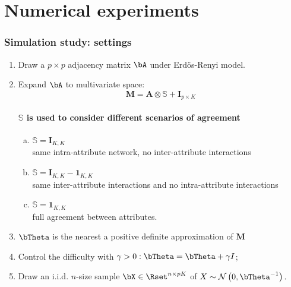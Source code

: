 \section{Numerical experiments}

\begin{frame}
  \frametitle{Simulation study: settings}

  \begin{enumerate}
\item  Draw a $p \times p$ adjacency matrix $\bA$ under Erd\"os-Renyi model.
\item  Expand $\bA$  to  multivariate space: 
  $$\mathbf{M} = \mathbf{A}  \otimes \mathbb{S} + \mathbf{I}_{p\times K}$$
  \paragraph{$\mathbb{S}$ is used to consider different scenarios of agreement}
  \begin{enumerate}[a)]
  \item $\mathbb{S} = \mathbf{I}_{K,K}$ \\ 
    \rsa same intra-attribute network, no inter-attribute interactions
  \item $\mathbb{S} = \mathbf{I}_{K,K} - \mathbf{1}_{K,K}$ \\ 
  \rsa same inter-attribute interactions and no intra-attribute interactions
  \item $\mathbb{S} = \mathbf{1}_{K,K}$ \\
    \rsa full agreement between  attributes.
  \end{enumerate}
\item $\bTheta$ is the nearest a positive definite approximation of $\mathbf{M}$
\item Control the difficulty with $\gamma>0: \bTheta= \bTheta+ \gamma I$;
\item Draw an i.i.d. $n$-size sample $\bX\in\Rset^{n\times pK}$ of
  $X \sim \mathcal{N} \left( 0,\invcov^{-1} \right) .$
\end{enumerate}


\end{frame}

